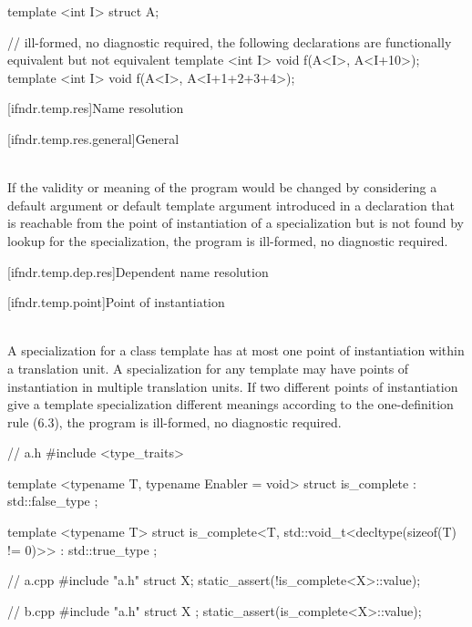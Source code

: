 \pnum
\begin{example}
\begin{codeblock}
template <int I>
struct A{};

// ill-formed, no diagnostic required, the following declarations are functionally equivalent but not equivalent
template <int I> void f(A<I>, A<I+10>);
template <int I> void f(A<I>, A<I+1+2+3+4>);
\end{codeblock}
\end{example}

[ifndr.temp.res]{Name resolution}

[ifndr.temp.res.general]{General}

\pnum
{} \\
If the validity or meaning of the program would be changed by considering a default argument or default
template argument introduced in a declaration that is reachable from the point of instantiation of a
specialization but is not found by lookup for the specialization, the program is ill-formed, no
diagnostic required.

\pnum
\begin{example}
\begin{codeblock}
\end{codeblock}
\end{example}

[ifndr.temp.dep.res]{Dependent name resolution}

[ifndr.temp.point]{Point of instantiation}

\pnum
{} \\
A specialization for a class template has at most one point of instantiation within a translation unit. A
specialization for any template may have points of instantiation in multiple translation units. If two different
points of instantiation give a template specialization different meanings according to the one-definition
rule (6.3), the program is ill-formed, no diagnostic required.

\pnum
\begin{example}
\begin{codeblock}
// a.h
#include <type_traits>

template <typename T, typename Enabler = void>
struct is_complete : std::false_type {};

template <typename T>
struct is_complete<T, std::void_t<decltype(sizeof(T) != 0)>> : std::true_type {};

// a.cpp
#include "a.h"
struct X;
static_assert(!is_complete<X>::value);

// b.cpp
#include "a.h"
struct X { };
static_assert(is_complete<X>::value);
\end{codeblock}
\end{example}


